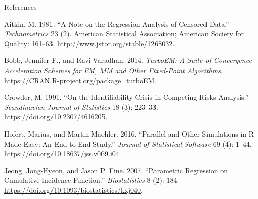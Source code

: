 \documentclass[10pt]{beamer}
\begin{document}
\begin{frame}[allowframebreaks]{References}
\label{References}

Aitkin, M. 1981. ``A Note on the Regression Analysis of Censored Data.''
\emph{Technometrics} 23 (2). American Statistical Association; American
Society for Quality: 161--63. \url{http://www.jstor.org/stable/1268032}.

Bobb, Jennifer F., and Ravi Varadhan. 2014. \emph{TurboEM: A Suite of
Convergence Acceleration Schemes for EM, MM and Other Fixed-Point
Algorithms}. \url{https://CRAN.R-project.org/package=turboEM}.

Crowder, M. 1991. ``On the Identifiability Crisis in Competing Risks
Analysis.'' \emph{Scandinavian Journal of Statistics}
18 (3): 223--33. \url{https://doi.org/10.2307/4616205}.

Hofert, Marius, and Martin Mächler. 2016. ``Parallel and Other
Simulations in R Made Easy: An End-to-End Study.'' \emph{Journal of
Statistical Software} 69 (4): 1--44.
\url{https://doi.org/10.18637/jss.v069.i04}.

Jeong, Jong-Hyeon, and Jason P. Fine. 2007. ``Parametric Regression on
Cumulative Incidence Function.'' \emph{Biostatistics} 8 (2): 184.
\url{https://doi.org/10.1093/biostatistics/kxj040}.

\end{frame}


\end{document}
